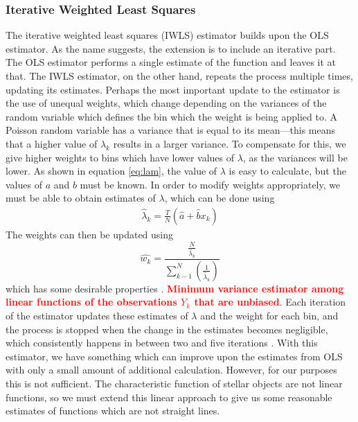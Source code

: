 \documentclass[a4paper,11pt]{article}
\begin{document}
\subsubsection{Iterative Weighted Least Squares}
\label{sec-6-1-2}

The iterative weighted least squares (IWLS) estimator builds upon the OLS
estimator. As the name suggests, the extension is to include an iterative
part. The OLS estimator performs a single estimate of the function and leaves it
at that. The IWLS estimator, on the other hand, repeats the process multiple
times, updating its estimates. Perhaps the most important update to the
estimator is the use of unequal weights, which change depending on the variances
of the random variable which defines the bin which the weight is being applied
to. A Poisson random variable has a variance that is equal to its mean---this
means that a higher value of ${\lambda}_k$ results in a larger variance. To
compensate for this, we give higher weights to bins which have lower values of
$\lambda$, as the variances will be lower. As shown in equation \eqref{eq:lam},
the value of $\lambda$ is easy to calculate, but the values of $a$ and $b$ must
be known. In order to modify weights appropriately, we must be able to obtain
estimates of $\lambda$, which can be done using \cite{massey1996estimating}
\begin{align}
\hat{\lambda}_k=\frac{T}{N}(\hat{a}+\hat{b}x_k)
\end{align}
The weights can then be updated using
\begin{equation}
\hat{w_k}=\frac{\displaystyle \frac{N}{\hat{\lambda}_k}}{\displaystyle \sum_{k-1}^N\left(\frac{1}{\hat{\lambda}_k}\right)}
\end{equation}
which has some desirable properties \cite{massey1996estimating}. \textcolor{red}{\textbf{Minimum
variance estimator among linear functions of the observations $Y_k$ that are
unbiased}}. Each iteration of the estimator updates these estimates of $\lambda$
and the weight for each bin, and the process is stopped when the change in the
estimates becomes negligible, which consistently happens in between two and five
iterations \cite{massey1996estimating}. With this estimator, we have something
which can improve upon the estimates from OLS with only a small amount of
additional calculation. However, for our purposes this is not sufficient. The
characteristic function of stellar objects are not linear functions, so we must
extend this linear approach to give us some reasonable estimates of functions
which are not straight lines.
\end{document}
